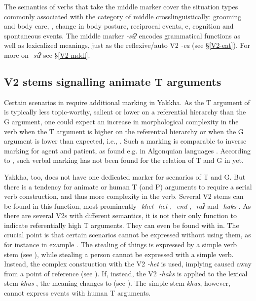 The semantics of verbs that take the middle marker cover the situation types commonly associated with the category of middle crosslinguistically: grooming and body care, , change in body posture, reciprocal events, e, cognition and spontaneous events. The middle marker \emph{-siʔ} encodes grammatical functions as well as lexicalized meanings, just as the reflexive/auto V2 \emph{-ca} (see §\ref{V2-eat}). For more on  \emph{-siʔ} see §\ref{V2-mddl}.


\subsection{V2 stems signalling animate T arguments}\label{t-sap}

Certain scenarios in  require additional marking in Yakkha. As the T argument of  is typically less topic-worthy, salient or lower on a referential hierarchy than the G argument, one could expect an increase in morphological complexity in the verb when the T argument is higher on the referential hierarchy or when the G argument is lower than expected, i.e.,  \citep[128]{Comrie1989Language}. Such a marking is comparable to inverse marking for agent and patient, as found e.g. in Algonquian languages \citep{Zuniga2007_From}. According to \citet[90ff]{Haspelmath2007Ditransitive}, such verbal marking has not been found  for the relation of T and G in  yet. 

Yakkha, too, does not have one dedicated marker for  scenarios of T and G. But there is a tendency for animate or human T (and P) arguments to require a serial verb construction, and thus more complexity in the verb. Several V2 stems  can be found in this function, most prominently \emph{-khet \ti -het} , \emph{-end} , \emph{-raʔ}  and \emph{-haks} . As there are several V2s  with different semantics, it is not their only function to indicate referentially high T arguments. They can even be found with in. The crucial point is that certain scenarios cannot be expressed without using them, as for instance in example \Next. The stealing of things is expressed by a simple verb stem (see \Next[a]), while stealing a person cannot be expressed with a simple verb. Instead, the complex construction with the V2 \emph{-het}  is used, implying caused  away from a point of reference  (see \Next[b]). If, instead, the V2 \emph{-haks}  is applied to the lexical stem \emph{khus} , the meaning changes to  (see \Next[c]). The simple stem \emph{khus}, however, cannot express events with human T arguments.


